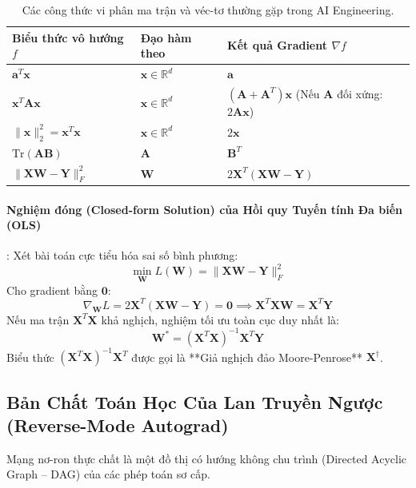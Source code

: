 \begin{table}[ht]
\centering
\small
\caption{Các công thức vi phân ma trận và véc-tơ thường gặp trong AI Engineering.}
\label{tab:matrix-derivatives}
\begin{tabular}{lll}
\toprule
\textbf{Biểu thức vô hướng $f$} & \textbf{Đạo hàm theo} & \textbf{Kết quả Gradient $\nabla f$} \\
\midrule
$\mathbf{a}^T \mathbf{x}$ & $\mathbf{x} \in \mathbb{R}^d$ & $\mathbf{a}$ \\
$\mathbf{x}^T \mathbf{A} \mathbf{x}$ & $\mathbf{x} \in \mathbb{R}^d$ & $(\mathbf{A} + \mathbf{A}^T)\mathbf{x}$ (Nếu $\mathbf{A}$ đối xứng: $2\mathbf{A}\mathbf{x}$) \\
$\|\mathbf{x}\|_2^2 = \mathbf{x}^T \mathbf{x}$ & $\mathbf{x} \in \mathbb{R}^d$ & $2\mathbf{x}$ \\
$\text{Tr}(\mathbf{A}\mathbf{B})$ & $\mathbf{A}$ & $\mathbf{B}^T$ \\
$\|\mathbf{X}\mathbf{W} - \mathbf{Y}\|_F^2$ & $\mathbf{W}$ & $2 \mathbf{X}^T (\mathbf{X}\mathbf{W} - \mathbf{Y})$ \\
\bottomrule
\end{tabular}
\end{table}

\paragraph{Nghiệm đóng (Closed-form Solution) của Hồi quy Tuyến tính Đa biến (OLS)}:
Xét bài toán cực tiểu hóa sai số bình phương:
\begin{equation}
\min_{\mathbf{W}} L(\mathbf{W}) = \|\mathbf{X}\mathbf{W} - \mathbf{Y}\|_F^2
\end{equation}
Cho gradient bằng $\mathbf{0}$:
\begin{equation}
\nabla_{\mathbf{W}} L = 2 \mathbf{X}^T (\mathbf{X}\mathbf{W} - \mathbf{Y}) = \mathbf{0} \implies \mathbf{X}^T \mathbf{X} \mathbf{W} = \mathbf{X}^T \mathbf{Y}
\end{equation}
Nếu ma trận $\mathbf{X}^T \mathbf{X}$ khả nghịch, nghiệm tối ưu toàn cục duy nhất là:
\begin{equation}
\mathbf{W}^* = (\mathbf{X}^T \mathbf{X})^{-1} \mathbf{X}^T \mathbf{Y}
\end{equation}
Biểu thức $(\mathbf{X}^T \mathbf{X})^{-1} \mathbf{X}^T$ được gọi là **Giả nghịch đảo Moore-Penrose** $\mathbf{X}^\dagger$.

\subsection{Bản Chất Toán Học Của Lan Truyền Ngược (Reverse-Mode Autograd)}
Mạng nơ-ron thực chất là một đồ thị có hướng không chu trình (Directed Acyclic Graph -- DAG) của các phép toán sơ cấp.

